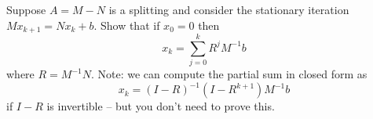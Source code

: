 \documentclass[12pt, leqno]{article}
\begin{document}

Suppose $A = M-N$ is a splitting and consider the stationary
iteration $M x_{k+1} = N x_k + b$.  Show that if $x_0 = 0$ then
\[
  x_k = \sum_{j=0}^k R^j M^{-1} b 
\]
where $R = M^{-1} N$.  Note: we can compute the partial sum in closed form
as
\[
  x_k = (I-R)^{-1} (I-R^{k+1}) M^{-1} b
\]
if $I-R$ is invertible -- but you don't need to prove this.
\end{document}
